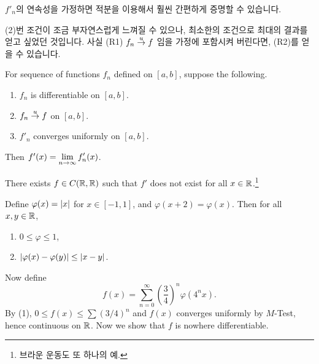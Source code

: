 \rmk \(f'_n\)의 연속성을 가정하면 적분을 이용해서 훨씬 간편하게 증명할 수 있습니다.

\rmk (2)번 조건이 조금 부자연스럽게 느껴질 수 있으나, 최소한의 조건으로 최대의 결과를 얻고 싶었던 것입니다. 사실 (R1) \(f_n \overset{u}{\rightarrow} f\) 임을 가정에 포함시켜 버린다면, (R2)를 얻을 수 있습니다.

\cor For sequence of functions \(f_n\) defined on \([a, b]\), suppose the following.
\begin{enumerate}
    \item \(f_n\) is differentiable on \([a, b]\).
    \item \(f_n \overset{u}{\rightarrow} f\) on \([a, b]\).
    \item \(f'_n\) converges uniformly on \([a, b]\).
\end{enumerate}
Then \(f'(x) = \displaystyle \lim_{n \rightarrow \infty} f'_n(x)\).

\medskip

 There exists \(f \in C(\mathbb{R}, \mathbb{R})\) such that \(f'\) does not exist for all \(x \in \mathbb{R}\).\footnote{브라운 운동도 또 하나의 예.}

\pf Define \(\varphi(x) = \left| x \right|\) for \(x \in [-1, 1]\), and \(\varphi(x + 2) = \varphi(x)\). Then for all \(x, y \in \mathbb{R}\),
\begin{enumerate}
    \item \(0 \leq \varphi \leq 1\),
    \item \(\left| \varphi(x) - \varphi(y) \right| \leq \left| x - y \right|\).
\end{enumerate}
Now define
\[
    f(x) = \sum_{n = 0}^\infty \left(\frac{3}{4}\right)^n \varphi(4^n x).
\]
By (1), \(0 \leq f(x) \leq \sum (3/4)^n\) and \(f(x)\) converges uniformly by \(M\)-Test, hence continuous on \(\mathbb{R}\). Now we show that \(f\) is nowhere differentiable.

